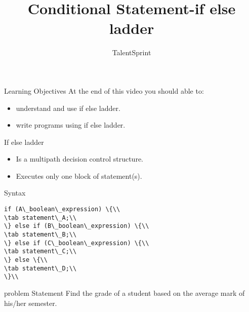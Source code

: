 \documentclass[aspectratio=169,14pt,usenames,dvipsnames]{beamer}
\title[Conditional Statement-if else ladder]{Conditional Statement-if else ladder}
\newcommand\tab[1][1cm]{\hspace*{#1}}
\begin{document}
{\1
\begin{frame} \vspace{35pt}

\subtitle{TalentSprint}
\maketitle
\end{frame}
}


\begin{frame}{Learning Objectives}
At the end of this video you should able to:
\begin{itemize}
\item understand and use if else ladder.
\item write programs using if else ladder.
\end{itemize}
\end{frame}


\begin{frame}{If else ladder}
\begin{itemize}
    \item Is a multipath decision control structure.
    \item Executes only one block of statement(s).
\end{itemize}
\end{frame}



\begin{frame}{Syntax}
\begin{lstlisting}
if (A\_boolean\_expression) \{\\
\tab statement\_A;\\
\} else if (B\_boolean\_expression) \{\\
\tab statement\_B;\\
\} else if (C\_boolean\_expression) \{\\
\tab statement\_C;\\
\} else \{\\
\tab statement\_D;\\
\}\\
\end{lstlisting}
\end{frame}



\begin{frame}{problem Statement}
Find the grade of a student based on the
average mark of his/her semester.
\end{frame}
\end{document}
